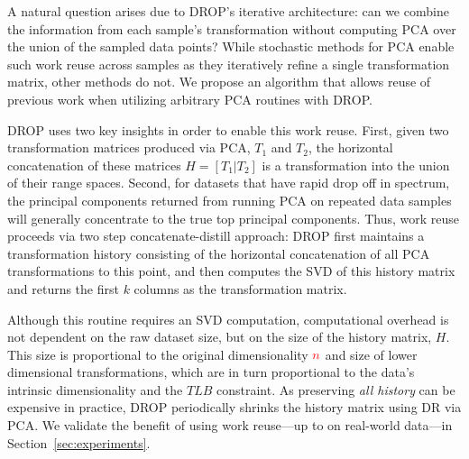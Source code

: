A natural question arises due to DROP's iterative architecture: can we combine the information from each sample's transformation without computing PCA over the union of the sampled data points? 
While stochastic methods for PCA enable such work reuse across samples as they iteratively refine a single transformation matrix, other methods do not.
We propose an algorithm that allows reuse of previous work when utilizing arbitrary PCA routines with DROP.

DROP uses two key insights in order to enable this work reuse.  
First, given two transformation matrices produced via PCA, $T_1$ and $T_2$, the horizontal concatenation of these matrices $H = [T_1 | T_2]$ is a transformation into the union of their range spaces.
Second, for datasets that have rapid drop off in spectrum, the principal components returned from running PCA on repeated data samples will generally concentrate to the true top principal components. 
Thus, work reuse proceeds via two step concatenate-distill approach:
DROP first maintains a transformation history consisting of the horizontal concatenation of all PCA transformations to this point, and then computes the SVD of this history matrix and returns the first $k$ columns as the transformation matrix. 

Although this routine requires an SVD computation, computational overhead is not dependent on the raw dataset size, but on the size of the history matrix, $H$.
This size is proportional to the original dimensionality ${\color{red}n}$ and size of lower dimensional transformations, which are in turn proportional to the data's intrinsic dimensionality and the $TLB$ constraint.
As preserving \emph{all history} can be expensive in practice, 
DROP periodically shrinks the history matrix using DR via PCA. 
We validate the benefit of using work reuse---up to  on real-world data---in Section~\ref{sec:experiments}.

